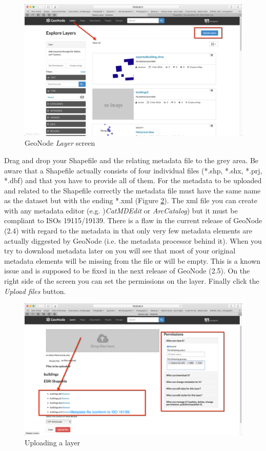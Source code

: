 \documentclass[a4paper,12pt,titlepage]{article}
\begin{document}
\begin{figure}[H]
	\centering
	\includegraphics[width=12cm]{Images/geonode_3.png}
	\caption{GeoNode \textit{Layer} screen}\label{fig:geonode_3}
\end{figure}

Drag and drop your Shapefile and the relating metadata file to the grey area. Be aware that a Shapefile actually consists of four individual files (*.shp, *.shx, *.prj, *.dbf) and that you have to provide all of them. For the metadata to be uploaded and related to the Shapefile correctly the metadata file must have the same name as the dataset but with the ending *.xml (Figure \ref{fig:geonode_4}). The xml file you can create with any metadata editor (e.g. )\textit{CatMDEdit} or \textit{ArcCatalog}) but it must be compliant to ISOs 19115/19139. There is a flaw in the current release of GeoNode (2.4) with regard to the metadata in that only very few metadata elements are actually diggested by GeoNode (i.e. the metadata processor behind it). When you try to download metadata later on you will see that most of your original metadata elements will be missing from the file or will be empty. This is a known issue and is supposed to be fixed in the next release of GeoNode (2.5). On the right side of the screen you can set the permissions on the layer. Finally click the \textit{Upload files} button.

\begin{figure}[H]
	\centering
	\includegraphics[width=12cm]{Images/geonode_4.png}
	\caption{Uploading a layer}\label{fig:geonode_4}
\end{figure}
\end{document}
